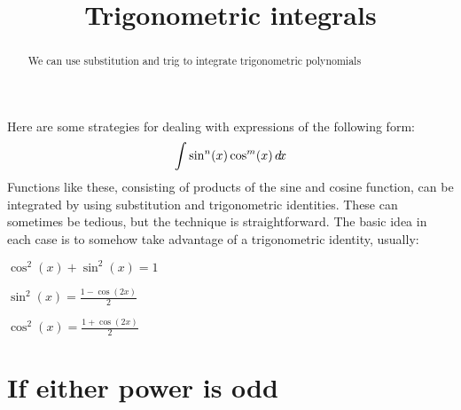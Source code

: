 \documentclass{ximera}
\title[Dig-In:]{Trigonometric integrals}
\begin{document}
\begin{abstract}
  We can use substitution and trig to integrate trigonometric polynomials
\end{abstract}
\maketitle

Here are some strategies for dealing with expressions of the following form:
\[
\int \sin^n(x)\cos^m(x) \mathop{}\!d\! x
\]
Functions like these, consisting of products of the sine and cosine
function, can be integrated by using substitution and trigonometric
identities. These can sometimes be tedious, but the technique is
straightforward. The basic idea in each case is to somehow take
advantage of a trigonometric identity, usually:
\begin{description}
\item[Pythagorean Identity] $\cos^2(x) + \sin^2(x) = 1$
\item[Sine Power-Reduction] $\sin^2(x) = \frac{1-\cos(2x)}{2}$
\item[Cosine Power-Reduction] $\cos^2(x)= \frac{1+\cos(2x)}{2}$
\end{description}

\section{If either power is odd}
\end{document}
